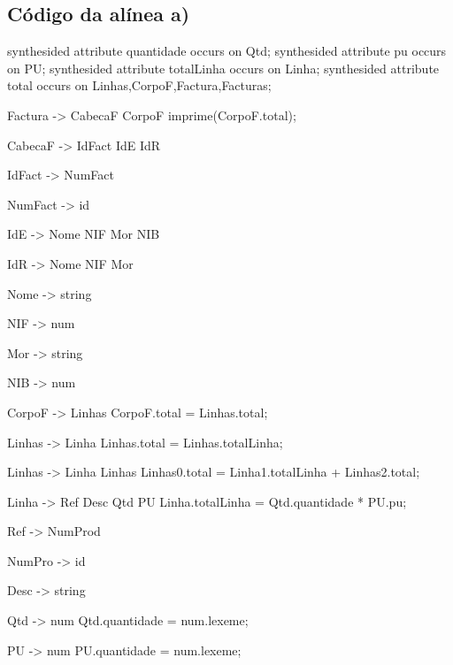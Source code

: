 \documentclass[11pt,a4paper]{article}
\begin{document}
\subsection{Código da alínea a)}
\begin{code_txt} 
synthesided attribute quantidade occurs on Qtd;
synthesided attribute pu occurs on PU;
synthesided attribute totalLinha occurs on Linha;
synthesided attribute total occurs on Linhas,CorpoF,Factura,Facturas;


Factura -> CabecaF CorpoF {imprime(CorpoF.total);}

CabecaF -> IdFact IdE IdR

IdFact -> NumFact

NumFact -> id

IdE -> Nome NIF Mor NIB

IdR -> Nome NIF Mor

Nome -> string

NIF -> num

Mor -> string

NIB -> num

CorpoF -> Linhas {CorpoF.total = Linhas.total;}

Linhas -> Linha {Linhas.total = Linhas.totalLinha;}

Linhas -> Linha Linhas {Linhas0.total = Linha1.totalLinha + Linhas2.total;}

Linha -> Ref Desc Qtd PU {Linha.totalLinha = Qtd.quantidade * PU.pu;}

Ref -> NumProd

NumPro -> id

Desc -> string

Qtd -> num  { Qtd.quantidade = num.lexeme;}

PU -> num	{ PU.quantidade = num.lexeme;}




\end{code_txt} 
\newpage
\end{document}
